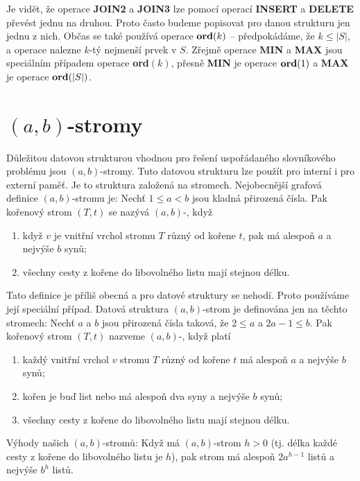 \documentclass[a4paper,12pt]{article}
\def \emph#1{\underbar{#1}}
\begin{document}
Je vidět, že operace {\bf JOIN2} a {\bf JOIN3} lze pomocí ope\-rací 
{\bf INSERT} a {\bf DELETE} převést jednu na druhou. Proto často budeme 
popisovat pro danou strukturu jen jednu z nich. 
Občas se také používá operace\newline 
$\bold o\bold r\bold d(k)$ -- předpokádáme, že $k\le |S
|$, a operace nalezne $k$-tý 
nejmenší prvek v $S$.\newline 
Zřejmě operace {\bf MIN} a {\bf MAX} jsou speciálním případem 
ope\-race {\bf ord$(k)$}, 
přesně {\bf MIN} je operace $\bold o\bold r\bold d(1)$ a {\bf MAX} je operace $
\bold o\bold r\bold d(|S|)$.

\section{$(a,b)$-stromy}

Důležitou datovou strukturou vhodnou pro 
řešení uspořá\-dané\-ho slovní\-ko\-vé\-ho problému jsou 
$(a,b)$-stromy. Tuto datovou strukturu lze použít pro interní i 
pro externí paměť. Je to struktura založená na stromech. 
Nejobecnější grafová defini\-ce $(a,b)$-stromu je:\newline 
Nechť $1\le a<b$ jsou kladná přirozená čísla. Pak kořenový 
strom $(T,t)$ se nazývá $(a,b)$-\emph{strom}, když 
\begin{enumerate}
\item
když $v$ je vnitřní vrchol stromu $T$ různý od 
kořene $t$, pak má alespoň $a$ a nejvýše $b$ synů;
\item
všechny cesty z kořene do libovolného listu mají 
stejnou délku.
\end{enumerate}
Tato definice je příliš obecná a pro datové struktury se 
nehodí. Proto používáme její speciální případ. Datová 
struktura $(a,b)$-strom je definována jen na těchto stromech: 
Nechť $a$ a $b$ jsou přirozená čísla taková, že $
2\le a$ a 
$2a-1\le b$. Pak kořenový 
strom $(T,t)$ nazveme $(a,b)$-\emph{strom}, když platí 
\begin{enumerate}
\item
každý vnitřní vrchol $v$ stromu $T$ různý od 
kořene $t$ má alespoň $a$ a nejvýše $b$ synů;
\item
kořen je buď list nebo má alespoň dva syny a nejvýše $
b$ 
synů;
\item
všechny cesty z kořene do libovolného listu mají 
stejnou délku.
\end{enumerate}

Výhody našich $(a,b)$-stromů:\newline 
Když má $(a,b)$-strom \emph{výšku} $h>0$ (tj. délka každé 
cesty z kořene do libovolného listu je $h$), pak 
strom má alespoň $2a^{h-1}$ listů a nejvýše $b^
h$ 
listů.
\end{document}
